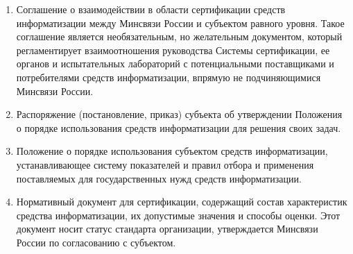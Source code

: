 \begin{enumerate}
\item Соглашение о взаимодействии в области сертификации средств информатизации между Минсвязи России и субъектом равного уровня. Такое соглашение является необязательным, но желательным документом, который регламентирует взаимоотношения руководства Системы сертификации, ее органов и испытательных лабораторий с потенциальными поставщиками и потребителями средств информатизации, впрямую не подчиняющимися Минсвязи России.
\item Распоряжение (постановление, приказ) субъекта об утверждении Положения о порядке использования средств информатизации для решения своих задач.
\item Положение о порядке использования субъектом средств информатизации, устанавливающее систему показателей и правил отбора и применения поставляемых для государственных нужд средств информатизации.
\item Нормативный документ для сертификации, содержащий состав характеристик средства информатизации, их допустимые значения и способы оценки. Этот документ носит статус стандарта организации, утверждается Минсвязи России по согласованию с субъектом.
\end{enumerate}
